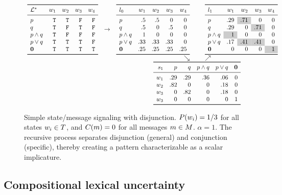 \documentclass{article}
\begin{document}
\begin{figure}[tp]
  \centering
  \setlength{\arraycolsep}{3pt} 
  $\begin{array}[b]{c c r@{\hspace{25pt}}l}
     \listenerMatrix%
     {\LexStar}%
     {\True & \True  & \False & \False}%
     {\True & \False & \True  & \False}%
     {\True & \False & \False & \False}%
     {\True & \True  & \True  & \False}%
     {\True & \True  & \True  & \True}%
     &
     \rightarrow
     &
     \listenerMatrix%
     {\listenerZero}%
     { .5 &  .5 &   0 & 0}%
     { .5 &   0 &  .5 & 0}%
     {1   &   0 &   0 & 0}%
     {.33 & .33 & .33 & 0}%
     {.25 & .25 & .25 & .25}%
     &
     \listenerMatrix%
     {\listenerOne}%
     { .29 & \graycell{.71} &   0 & 0}%
     { .29 &   0 & \graycell{.71} & 0}%
     {\graycell{1} &   0 &   0 & 0}%
     { .17 & \graycell{.41} & \graycell{.41} & 0}%
     {   0 &   0 &   0 & \graycell{1}}%
   \\
   && \searrow & \nearrow
   \\
   &&
   \multicolumn{2}{c}{
      \speakerMatrix%
      {\speakerOne}%
      {.29 & .29 & .36 & .06 & 0}%
      {.82 & 0   &   0 & .18 & 0}%
      {  0 & .82 &   0 & .18 & 0}%
      {  0 &   0 &   0 &   0 & 1}%
   }
   \end{array}$   
   \caption{Simple state/message signaling with
     disjunction. $P(w_{i}) = 1/3$ for all states
     $w_{i} \in T$, and $C(m) = 0$ for all messages
     $m \in M$.  $\alpha = 1$. The recursive process
     separates disjunction (general) and conjunction (specific),
     thereby creating a pattern characterizable as a scalar
     implicature.}
  \label{fig:rsa-disj}
\end{figure}


\subsection{Compositional lexical uncertainty}\label{sec:lex}
\end{document}
